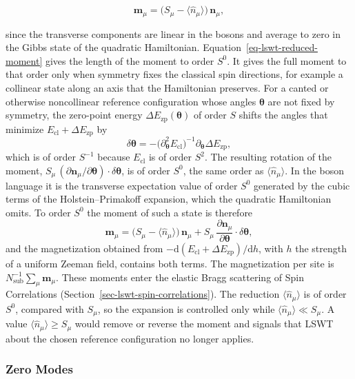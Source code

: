 \begin{equation}\label{eq-lswt-reduced-moment}
\mathbf m_\mu=\big(S_\mu-\langle\hat n_\mu\rangle\big)\,\mathbf n_\mu,
\end{equation}

since the transverse components are linear in the bosons and average to zero in the Gibbs state of the quadratic Hamiltonian. Equation~\eqref{eq-lswt-reduced-moment} gives the length of the moment to order \(S^0\). It gives the full moment to that order only when symmetry fixes the classical spin directions, for example a collinear state along an axis that the Hamiltonian preserves. For a canted or otherwise noncollinear reference configuration whose angles \(\boldsymbol\theta\) are not fixed by symmetry, the zero-point energy \(\Delta E_{\mathrm{zp}}(\boldsymbol\theta)\) of order \(S\) shifts the angles that minimize \(E_{\mathrm{cl}}+\Delta E_{\mathrm{zp}}\) by
\[
\delta\boldsymbol\theta=-\big(\partial_{\boldsymbol\theta}^2E_{\mathrm{cl}}\big)^{-1}\partial_{\boldsymbol\theta}\Delta E_{\mathrm{zp}},
\]
which is of order \(S^{-1}\) because \(E_{\mathrm{cl}}\) is of order \(S^2\). The resulting rotation of the moment, \(S_\mu\,(\partial\mathbf n_\mu/\partial\boldsymbol\theta)\cdot\delta\boldsymbol\theta\), is of order \(S^0\), the same order as \(\langle\hat n_\mu\rangle\). In the boson language it is the transverse expectation value of order \(S^0\) generated by the cubic terms of the Holstein--Primakoff expansion, which the quadratic Hamiltonian omits. To order \(S^0\) the moment of such a state is therefore
\[
\mathbf m_\mu=\big(S_\mu-\langle\hat n_\mu\rangle\big)\,\mathbf n_\mu+S_\mu\,\frac{\partial\mathbf n_\mu}{\partial\boldsymbol\theta}\cdot\delta\boldsymbol\theta,
\]
and the magnetization obtained from \(-\mathrm d(E_{\mathrm{cl}}+\Delta E_{\mathrm{zp}})/\mathrm dh\), with \(h\) the strength of a uniform Zeeman field, contains both terms. The magnetization per site is \(N_{\mathrm{sub}}^{-1}\sum_\mu\mathbf m_\mu\). These moments enter the elastic Bragg scattering of Spin Correlations (Section~\ref{sec-lswt-spin-correlations}). The reduction \(\langle\hat n_\mu\rangle\) is of order \(S^0\), compared with \(S_\mu\), so the expansion is controlled only while \(\langle\hat n_\mu\rangle\ll S_\mu\). A value \(\langle\hat n_\mu\rangle\ge S_\mu\) would remove or reverse the moment and signals that LSWT about the chosen reference configuration no longer applies.

\subsubsection{Zero Modes}

